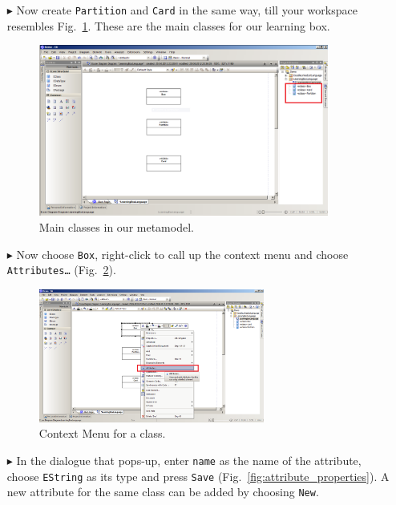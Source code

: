 \begin{enumerate}
 
\item[$\blacktriangleright$] Now create \texttt{Partition} and \texttt{Card} in the same way, till your workspace resembles Fig.~\ref{fig:all_eclasses}.  
These are the main classes for our learning box.

\begin{figure}[htbp]
	\centering
  \includegraphics[width=0.9\textwidth]{pics/memBoxBilder/memBox10.png}
	\caption{Main classes in our metamodel.}
	\label{fig:all_eclasses}
\end{figure}

\item[$\blacktriangleright$] Now choose \texttt{Box}, right-click to call up the context menu and choose \texttt{Att\-ri\-butes\ldots} (Fig.~\ref{fig:attribute}).

\begin{figure}[htbp]
	\centering
  \includegraphics[width=0.7\textwidth]{pics/memBoxBilder/memBox11.png}
	\caption{Context Menu for a class.}
	\label{fig:attribute}
\end{figure}


\item[$\blacktriangleright$] In the dialogue that pops-up, enter \texttt{name} as the name of the attribute, choose \texttt{EString} as its type and press \texttt{Save} (Fig.~\ref{fig:attribute_properties}).  
A new attribute for the same class can be added by choosing \texttt{New}.


\end{enumerate}
